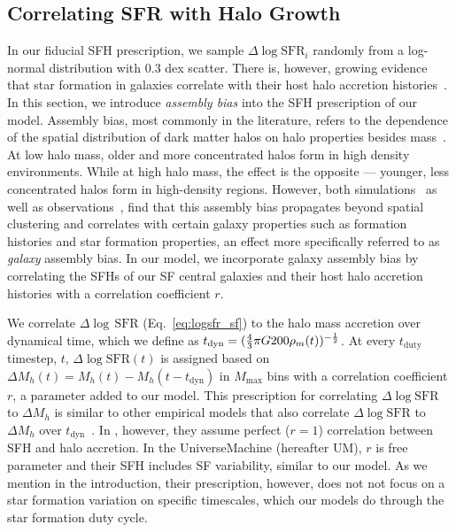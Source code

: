 \documentclass[12pt, letterpaper, preprint, tighten]{aastex62}
\newcommand{\edt}[1]{{\color{dred}{\bf} #1}}
\newcommand{\logsfr}{\log\mathrm{SFR}}
\begin{document}
\subsection{Correlating SFR with Halo Growth}
In our fiducial SFH prescription, we sample $\Delta \logsfr_i$ randomly from a
log-normal distribution with $0.3$ dex scatter. There is, however, growing evidence 
that star formation in galaxies correlate with their host halo accretion 
histories~\citep[\emph{e.g.}][]{lim2016, tojeiro2017, tinker2018b}.
In this section, we introduce \emph{assembly bias} into the SFH prescription of our 
model. Assembly bias, most commonly in the literature, refers to the dependence of the
spatial distribution of dark matter halos on halo properties besides
mass~\citep{gao2005,wechsler2006,gao2007,wetzel2007,li2008,sunayama2016}.
At low halo mass, older and more concentrated halos form in high density environments.
While at high halo mass, the effect is the opposite --- younger, less concentrated
halos form in high-density regions. However, both
simulations~\citep{croton2007, artale2018, zehavi2018} as well as
observations~\citep{yang2006,wang2008,tinker2011,wang2013,lacerna2014,calderon2018,tinker2018},
find that this assembly bias propagates beyond spatial clustering and correlates
with certain galaxy properties such as formation histories and star formation
properties, an effect more specifically referred to as {\em galaxy} assembly bias.
In our model, we incorporate galaxy assembly bias by correlating the SFHs
of our SF central galaxies and their host halo accretion histories
with a correlation coefficient $r$.

We correlate $\Delta\log\,\mathrm{SFR}$ (Eq.~\ref{eq:logsfr_sf}) to the halo 
mass accretion over dynamical time, 
\edt{which we define as $t_{\rm dyn} = (\frac{4}{3}\pi G 200\rho_m(t))^{-\frac{1}{2}}$}.
At every $t_\mathrm{duty}$ timestep, $t$, $\Delta\logsfr(t)$ is assigned based on 
$\Delta M_h(t) = M_h(t) - M_h(t - t_\mathrm{dyn})$ in $M_\mathrm{max}$ bins
with a correlation coefficient $r$, a parameter added to our model. 
This prescription for correlating $\Delta\log\mathrm{SFR}$ to $\Delta M_h$ is
similar to other empirical models that also correlate $\Delta\log\mathrm{SFR}$
to $\Delta M_h$ over $t_\mathrm{dyn}$~\citep{rodriguez-puebla2016a, behroozi2019}.
In \cite{rodriguez-puebla2016a}, however, they assume perfect ($r=1$) correlation
between SFH and halo accretion. In the \cite{behroozi2019} {\sc UniverseMachine}
(hereafter UM), $r$ is free parameter and their SFH includes SF variability,
similar to our model. As we mention in the introduction, their prescription,
however, does not not focus on a star formation variation on specific timescales,
which our models do through the star formation duty cycle.
\end{document}

